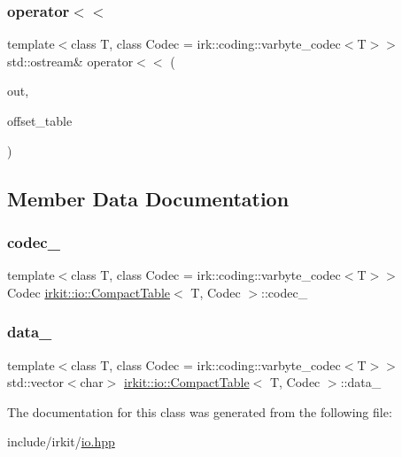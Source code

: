 \subsubsection{\texorpdfstring{operator$<$$<$}{operator<<}}
{\footnotesize\ttfamily template$<$class T, class Codec = irk\+::coding\+::varbyte\+\_\+codec$<$\+T$>$$>$ \\
std\+::ostream\& operator$<$$<$ (\begin{DoxyParamCaption}\item[{std\+::ostream \&}]{out,  }\item[{const \mbox{\hyperlink{classirkit_1_1io_1_1CompactTable}{Compact\+Table}}$<$ T, Codec $>$ \&}]{offset\+\_\+table }\end{DoxyParamCaption})\hspace{0.3cm}{\ttfamily [friend]}}



\subsection{Member Data Documentation}
\mbox{\label{classirkit_1_1io_1_1CompactTable_a34214e6ffd6236be620e54af4b9af3f9}} 
\subsubsection{\texorpdfstring{codec\+\_\+}{codec\_}}
{\footnotesize\ttfamily template$<$class T, class Codec = irk\+::coding\+::varbyte\+\_\+codec$<$\+T$>$$>$ \\
Codec \mbox{\hyperlink{classirkit_1_1io_1_1CompactTable}{irkit\+::io\+::\+Compact\+Table}}$<$ T, Codec $>$\+::codec\+\_\+\hspace{0.3cm}{\ttfamily [protected]}}

\mbox{\label{classirkit_1_1io_1_1CompactTable_a75795593fd6e9c81d95faa07b4a0618a}} 
\subsubsection{\texorpdfstring{data\+\_\+}{data\_}}
{\footnotesize\ttfamily template$<$class T, class Codec = irk\+::coding\+::varbyte\+\_\+codec$<$\+T$>$$>$ \\
std\+::vector$<$char$>$ \mbox{\hyperlink{classirkit_1_1io_1_1CompactTable}{irkit\+::io\+::\+Compact\+Table}}$<$ T, Codec $>$\+::data\+\_\+\hspace{0.3cm}{\ttfamily [protected]}}



The documentation for this class was generated from the following file\+:\begin{DoxyCompactItemize}
\item 
include/irkit/\mbox{\hyperlink{io_8hpp}{io.\+hpp}}\end{DoxyCompactItemize}
